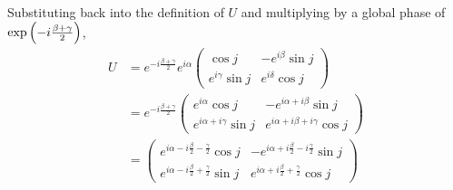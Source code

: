 %
Substituting back into the definition of $U$ and multiplying by a global phase of $\exp \left( -i\frac{\beta+\gamma}{2} \right)$,
\begin{align}
U &= e^{-i\frac{\beta+\gamma}{2}} e^{i\alpha} \begin{pmatrix} \cos j & -e^{i\beta} \sin j \\ e^{i\gamma} \sin j & e^{i\delta} \cos j \end{pmatrix} \\
&= e^{-i\frac{\beta+\gamma}{2}} \begin{pmatrix} e^{i\alpha} \cos j & -e^{i\alpha+i\beta} \sin j \\ e^{i\alpha+i\gamma} \sin j & e^{i\alpha+i\beta+i\gamma} \cos j \end{pmatrix} \\
&= \begin{pmatrix} e^{i\alpha-i\frac{\beta}{2}-\frac{\gamma}{2}} \cos j & -e^{i\alpha+i\frac{\beta}{2}-i\frac{\gamma}{2}} \sin j \\ e^{i\alpha-i\frac{\beta}{2}+\frac{\gamma}{2}} \sin j & e^{i\alpha+i\frac{\beta}{2}+\frac{\gamma}{2}} \cos j \end{pmatrix} \\
\end{align}
\endgroup
